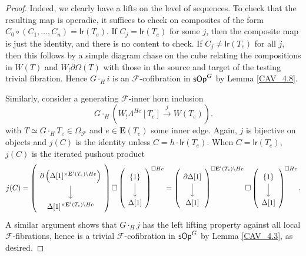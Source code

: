 \documentclass[a4paper,10pt
,draft
]{article}%
\renewcommand{\F}{\mathcal F}
\renewcommand{\1}{\eta}%
\begin{document}
\begin{proof}
      {\color{OliveGreen} %
        Indeed, we clearly have a lifts on the level of sequences.
        To check that the resulting map is operadic, it suffices to check on composites of the form
        $C_0 \circ (C_1, \dots, C_n) = \mathsf{lr}(T_e)$.
        If $C_j = \mathsf{lr}(T_e)$ for some $j$, then the composite map is just the identity, and there is no content to check.
        If $C_j \neq \mathsf{lr}(T_e)$ for all $j$,
        then this follows by a simple diagram chase on the cube relating the compositions in $W(T)$ and $W_! \partial \Omega(T)$ with those in the source and target of the testing trivial fibration.
      } %
      Hence $G \cdot_H i$ is an $\F$-cofibration in $\mathsf{sOp}^G$ by Lemma \ref{CAV_4.8}.
      
     
      Similarly, consider a generating $\F$-inner horn inclusion
      \[
            G \cdot_H \left(W_! \Lambda^{H e}[T_e] \xrightarrow{\ j \ } W(T_e) \right).
      \]
      with $T \simeq G \cdot_H T_e \in \Omega_\F$ and $e \in \mathbf E(T_e)$ some inner edge.
      Again, $j$ is bijective on objects and $j(C)$ is the identity unless $C = h \cdot \mathsf{lr}(T_e)$.
      When $C = \mathsf{lr}(T_e)$, $j(C)$ is the iterated pushout product
      \begin{equation}
            j(C) =
            \left(
                  \begin{tikzcd}
                        \partial \left(
                              \Delta[1]^{\times \mathbf E^i(T_e) \setminus H e}
                        \right) \arrow[d]
                        \\
                        \Delta[1]^{\times \mathbf E^i(T_e) \setminus H e}
                  \end{tikzcd}
            \right) \square
            \left(
                  \begin{tikzcd}
                        \set{1} \arrow[d]
                        \\
                        \Delta[1]
                  \end{tikzcd}
            \right)^{\square H e}
            =
            \left(
                  \begin{tikzcd}
                        \partial \Delta[1] \arrow[d]
                        \\
                        \Delta[1]
                  \end{tikzcd}
            \right)^{\square \mathbf E^i(T_e) \setminus H e}
            \square
            \left(
                  \begin{tikzcd}
                        \set{1} \arrow[d]
                        \\
                        \Delta[1]
                  \end{tikzcd}
            \right)^{\square H e}.                              
      \end{equation}
      A similar argument shows that $G \cdot_H j$ has the left lifting property against all local $\F$-fibrations,
      hence is a trivial $\F$-cofibration in $\mathsf{sOp}^G$ by Lemma \ref{CAV_4.3}, as desired. 
\end{proof}
\end{document}
